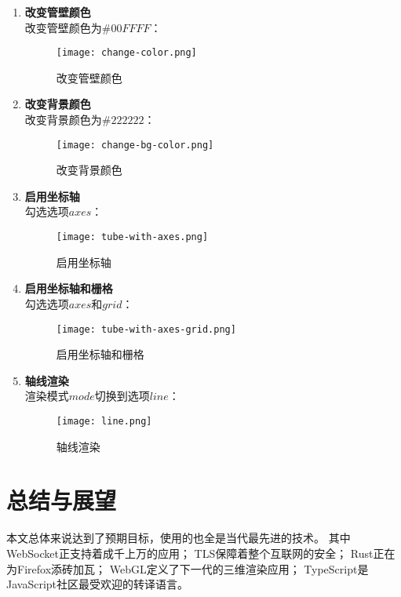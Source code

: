 \begin{enumerate}

\item \textbf{改变管壁颜色} \\
改变管壁颜色为$\#00FFFF$：

\begin{figure}[H]
\centering
\texttt{[image: change-color.png]}
\caption{改变管壁颜色}
\label{fig:change-color}
\end{figure}

\item \textbf{改变背景颜色} \\
改变背景颜色为$\#222222$：

\begin{figure}[H]
\centering
\texttt{[image: change-bg-color.png]}
\caption{改变背景颜色}
\label{fig:change-bg-color}
\end{figure}

\item \textbf{启用坐标轴} \\
勾选选项$axes$：

\begin{figure}[H]
\centering
\texttt{[image: tube-with-axes.png]}
\caption{启用坐标轴}
\label{fig:tube-with-axes}
\end{figure}

\item \textbf{启用坐标轴和栅格} \\
勾选选项$axes$和$grid$：

\begin{figure}[H]
\centering
\texttt{[image: tube-with-axes-grid.png]}
\caption{启用坐标轴和栅格}
\label{fig:tube-with-axes-grid}
\end{figure}

\item \textbf{轴线渲染} \\
渲染模式$mode$切换到选项$line$：

\begin{figure}[H]
\centering
\texttt{[image: line.png]}
\caption{轴线渲染}
\label{fig:line}
\end{figure}

\end{enumerate}

\cleardoublepage

\section{总结与展望}
本文总体来说达到了预期目标，使用的也全是当代最先进的技术。
其中WebSocket正支持着成千上万的应用；
TLS保障着整个互联网的安全；
Rust正在为Firefox添砖加瓦；
WebGL定义了下一代的三维渲染应用；
TypeScript是JavaScript社区最受欢迎的转译语言。

